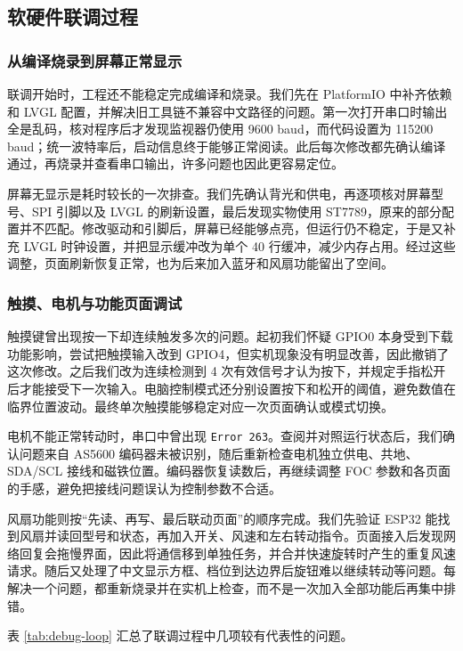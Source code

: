 \subsection{软硬件联调过程}

\subsubsection{从编译烧录到屏幕正常显示}

联调开始时，工程还不能稳定完成编译和烧录。我们先在 PlatformIO 中补齐依赖和 LVGL 配置，并解决旧工具链不兼容中文路径的问题。第一次打开串口时输出全是乱码，核对程序后才发现监视器仍使用 9600 baud，而代码设置为 115200 baud；统一波特率后，启动信息终于能够正常阅读。此后每次修改都先确认编译通过，再烧录并查看串口输出，许多问题也因此更容易定位。

屏幕无显示是耗时较长的一次排查。我们先确认背光和供电，再逐项核对屏幕型号、SPI 引脚以及 LVGL 的刷新设置，最后发现实物使用 ST7789，原来的部分配置并不匹配。修改驱动和引脚后，屏幕已经能够点亮，但运行仍不稳定，于是又补充 LVGL 时钟设置，并把显示缓冲改为单个 40 行缓冲，减少内存占用。经过这些调整，页面刷新恢复正常，也为后来加入蓝牙和风扇功能留出了空间。

\subsubsection{触摸、电机与功能页面调试}

触摸键曾出现按一下却连续触发多次的问题。起初我们怀疑 GPIO0 本身受到下载功能影响，尝试把触摸输入改到 GPIO4，但实机现象没有明显改善，因此撤销了这次修改。之后我们改为连续检测到 4 次有效信号才认为按下，并规定手指松开后才能接受下一次输入。电脑控制模式还分别设置按下和松开的阈值，避免数值在临界位置波动。最终单次触摸能够稳定对应一次页面确认或模式切换。

电机不能正常转动时，串口中曾出现 \texttt{Error 263}。查阅并对照运行状态后，我们确认问题来自 AS5600 编码器未被识别，随后重新检查电机独立供电、共地、SDA/SCL 接线和磁铁位置。编码器恢复读数后，再继续调整 FOC 参数和各页面的手感，避免把接线问题误认为控制参数不合适。

风扇功能则按“先读、再写、最后联动页面”的顺序完成。我们先验证 ESP32 能找到风扇并读回型号和状态，再加入开关、风速和左右转动指令。页面接入后发现网络回复会拖慢界面，因此将通信移到单独任务，并合并快速旋转时产生的重复风速请求。随后又处理了中文显示方框、档位到达边界后旋钮难以继续转动等问题。每解决一个问题，都重新烧录并在实机上检查，而不是一次加入全部功能后再集中排错。

表 \ref{tab:debug-loop} 汇总了联调过程中几项较有代表性的问题。

